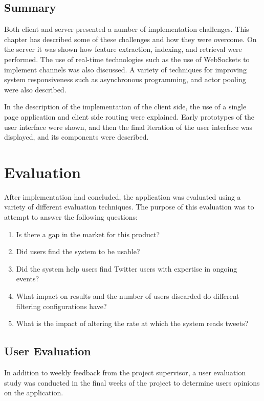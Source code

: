 \documentclass{l4proj}
\begin{document}
        
    \section{Summary}
    Both client and server presented a number of implementation challenges. This chapter has described some of these challenges and how they were overcome. On the server it was shown how feature extraction, indexing, and retrieval were performed. The use of real-time technologies such as the use of WebSockets to implement channels was also discussed. A variety of techniques for improving system responsiveness such as asynchronous programming, and actor pooling were also described.
    
    In the description of the implementation of the client side, the use of a single page application and client side routing were explained. Early prototypes of the user interface were shown, and then the final iteration of the user interface was displayed, and its components were described.        
        
        
\chapter{Evaluation}

After implementation had concluded, the application was evaluated using a variety of different evaluation techniques. The purpose of this evaluation was to attempt to answer the following questions:

\begin{enumerate}
\item Is there a gap in the market for this product?
\item Did users find the system to be usable?
\item Did the system help users find Twitter users with expertise in ongoing events?
\item What impact on results and the number of users discarded do different filtering configurations have?
\item What is the impact of altering the rate at which the system reads tweets?
\end{enumerate}


\section{User Evaluation}

    In addition to weekly feedback from the project supervisor, a user evaluation study was conducted in the final weeks of the project to determine users opinions on the application.
\end{document}
